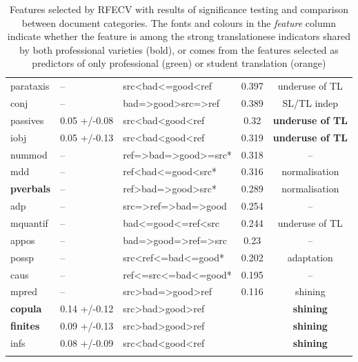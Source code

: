\begin{longtable}{l|llcc}
		\textcolor{Dandelion}{parataxis}    & --  & src<bad<=good<ref    & 0.397 & underuse of TL \\
		conj         & --           & bad=>good>src=>ref & 0.389 &  SL/TL indep \\
		\textcolor{cadmiumgreen}{passives}     & 0.05 +/-0.08 & src<bad<good<ref & 0.32 & \textbf{underuse of TL} \\
		\textcolor{Dandelion}{iobj}    & 0.05 +/-0.13 & src<bad<good<ref & 0.319 & \textbf{underuse of TL} \\
		\textcolor{Dandelion}{nummod}  & -- & ref=>bad=>good>=src* & 0.318 & -- \\
		\textcolor{cadmiumgreen}{mdd}  & -- & ref<bad<=good<src*    & 0.316 & normalisation \\
		\textbf{pverbals}     & --     & ref>bad=>good>src* & 0.289 & normalisation  \\
		\textcolor{cadmiumgreen}{adp}  & -- & src=>ref=>bad=>good & 0.254 & -- \\
		\textcolor{Dandelion}{mquantif}& -- & bad<=good<=ref<src & 0.244 & underuse of TL  \\
		appos        & --           & bad=>good=>ref=>src & 0.23 & --  \\
		possp        & --           & src<ref<=bad<=good*    & 0.202 & adaptation \\
		\textcolor{Dandelion}{caus} & -- & ref<=src<=bad<=good*  & 0.195 & -- \\
		\textcolor{Dandelion}{mpred} & -- & src>bad=>good>ref & 0.116 & shining \\
		\midrule
		\textbf{copula}       & 0.14 +/-0.12 & src>bad>good>ref &  & \textbf{shining}           \\
		\textbf{finites}      & 0.09 +/-0.13 & src>bad>good>ref &     & \textbf{shining}      \\
		\textcolor{Dandelion}{infs}         & 0.08 +/-0.09 & src<bad<good<ref    &  & \textbf{shining}          \\		
		\bottomrule
\caption{\label{tab:bad-good_indicators}Features selected by RFECV with results of significance testing and comparison between document categories. The fonts and colours in the \textit{feature} column indicate whether the feature is among the strong translationese indicators shared by both professional varieties (bold), or comes from the features selected as predictors of only professional (green) or student translation (orange)}\\
\end{longtable}
